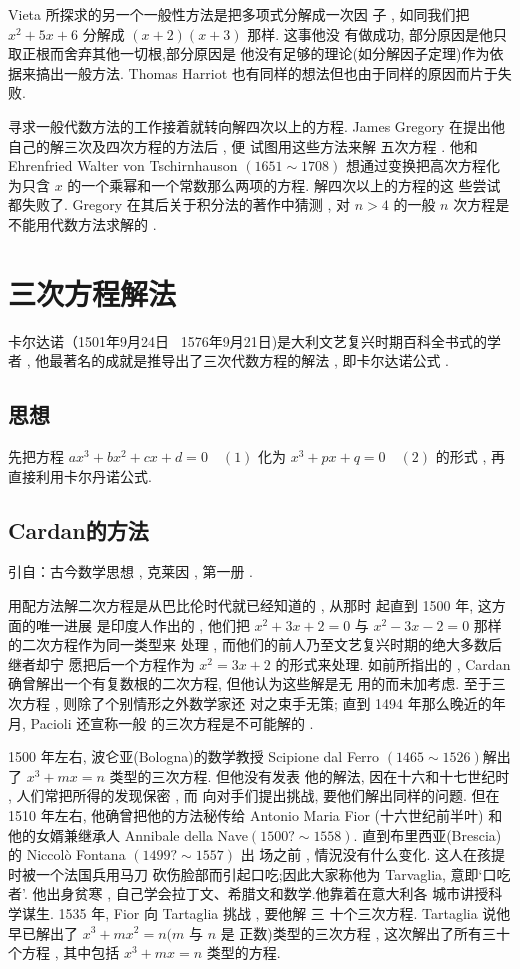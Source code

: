 Vieta 所探求的另一个一般性方法是把多项式分解成一次因
子 , 如同我们把 $x^{2}+5 x+6$ 分解成 $(x+2)(x+3)$ 那样. 这事他没
有做成功, 部分原因是他只取正根而舍弃其他一切根,部分原因是
他没有足够的理论(如分解因子定理)作为依据来搞出一般方法.
Thomas Harriot 也有同样的想法但也由于同样的原因而片于失
败.

寻求一般代数方法的工作接着就转向解四次以上的方程.
James Gregory 在提出他自己的解三次及四次方程的方法后 , 便 
试图用这些方法来解 五次方程 . 他和 Ehrenfried Walter von
Tschirnhauson $(1651 \sim 1708)$ 想通过变换把高次方程化为只含 $x$
的一个乘幂和一个常数那么两项的方程. 解四次以上的方程的这
些尝试都失败了. Gregory 在其后关于积分法的著作中猜测 , 对
$n>4$ 的一般 $n$ 次方程是不能用代数方法求解的 . 

\section{三次方程解法}

卡尔达诺（1501年9月24日 ~1576年9月21日)是大利文艺复兴时期百科全书式的学者 , 他最著名的成就是推导出了三次代数方程的解法 , 即卡尔达诺公式 . 

\subsection{思想}
先把方程 $a x^{3}+b x^{2}+c x+d=0 \quad (1)$ 
化为 $x^{3}+p x+q=0 \quad (2)$ 的形式 , 再直接利用卡尔丹诺公式.


\subsection{Cardan的方法}
引自：古今数学思想 , 克莱因 , 第一册 . 

用配方法解二次方程是从巴比伦时代就已经知道的 , 从那时
起直到 1500 年, 这方面的唯一进展 是印度人作出的 , 他们把 
$x^{2}+3 x+2=0$ 与 $x^{2}-3 x-2=0$ 那样的二次方程作为同一类型来
处理 , 而他们的前人乃至文艺复兴时期的绝大多数后继者却宁
愿把后一个方程作为 $x^{2}=3 x+2$ 的形式来处理. 如前所指出的 ,  
Cardan 确曾解出一个有复数根的二次方程, 但他认为这些解是无
用的而未加考虑. 至于三次方程 , 则除了个别情形之外数学家还
对之束手无策; 直到 1494 年那么晚近的年月, Pacioli 还宣称一般
的三次方程是不可能解的 . 

1500 年左右, 波仑亚(Bologna)的数学教授 Scipione dal Ferro
$(1465 \sim 1526)$解出了 $x^{3}+m x=n$ 类型的三次方程. 但他没有发表
他的解法, 因在十六和十七世纪时 , 人们常把所得的发现保密 , 而
向对手们提出挑战, 要他们解出同样的问题. 但在 1510 年左右,
他确曾把他的方法秘传给 Antonio Maria Fior (十六世纪前半叶)
和他的女婿兼继承人 Annibale della Nave$(1500 ? \sim 1558) .$
直到布里西亚(Brescia)的 Niccolò Fontana $(1499 ? \sim 1557)$ 出 
场之前 , 情況没有什么变化. 这人在孩提时被一个法国兵用马刀
砍伤脸部而引起口吃;因此大家称他为 Tarvaglia, 意即‘口吃者’.
他出身贫寒 , 自己学会拉丁文、希腊文和数学.他靠着在意大利各
城市讲授科学谋生. 1535 年, Fior 向 Tartaglia 挑战 , 要他解 三 
十个三次方程. Tartaglia 说他早已解出了 $x^{3}+m x^{2}=n(m$ 与 $n$ 是 
正数)类型的三次方程 , 这次解出了所有三十个方程 , 其中包括 $x^{3}+m x=n$ 类型的方程.


